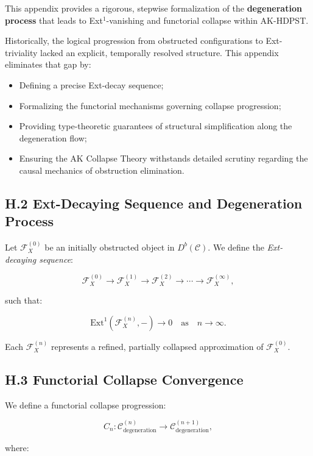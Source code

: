 \documentclass[11pt]{article}
\begin{document}
This appendix provides a rigorous, stepwise formalization of the \textbf{degeneration process} that leads to Ext$^1$-vanishing and functorial collapse within AK-HDPST.

Historically, the logical progression from obstructed configurations to Ext-triviality lacked an explicit, temporally resolved structure. This appendix eliminates that gap by:

\begin{itemize}
    \item Defining a precise Ext-decay sequence;
    \item Formalizing the functorial mechanisms governing collapse progression;
    \item Providing type-theoretic guarantees of structural simplification along the degeneration flow;
    \item Ensuring the AK Collapse Theory withstands detailed scrutiny regarding the causal mechanics of obstruction elimination.
\end{itemize}

\subsection*{H.2 Ext-Decaying Sequence and Degeneration Process}

Let \( \mathcal{F}_X^{(0)} \) be an initially obstructed object in \( D^b(\mathcal{C}) \). We define the \emph{Ext-decaying sequence}:

\[
\mathcal{F}_X^{(0)} \longrightarrow \mathcal{F}_X^{(1)} \longrightarrow \mathcal{F}_X^{(2)} \longrightarrow \cdots \longrightarrow \mathcal{F}_X^{(\infty)},
\]

such that:

\[
\mathrm{Ext}^1\left( \mathcal{F}_X^{(n)}, - \right) \to 0 \quad \text{as} \quad n \to \infty.
\]

Each \( \mathcal{F}_X^{(n)} \) represents a refined, partially collapsed approximation of \( \mathcal{F}_X^{(0)} \).

\subsection*{H.3 Functorial Collapse Convergence}

We define a functorial collapse progression:

\[
C_n : \mathcal{C}_{\mathrm{degeneration}}^{(n)} \longrightarrow \mathcal{C}_{\mathrm{degeneration}}^{(n+1)},
\]

where:
\end{document}
